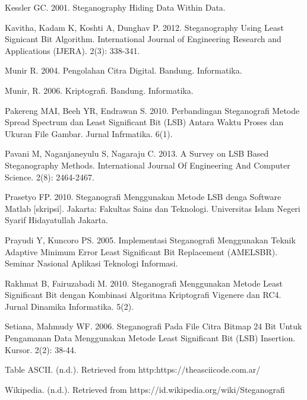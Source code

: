 \documentclass{jtetiskripsi}
\begin{document}
\begin{thebibliography}{99}
	 Kessler GC. 2001. Steganography Hiding Data Within Data.
	
	 Kavitha, Kadam K, Koshti A, Dunghav P. 2012. Steganography Using Least Signicant Bit Algorithm. International Journal of Engineering Research and Applications (IJERA). 2(3): 338-341.
	
	 Munir R. 2004. Pengolahan Citra Digital. Bandung. Informatika.
	
	 Munir, R. 2006. Kriptografi. Bandung. Informatika.
	
	 Pakereng MAI, Beeh YR, Endrawan S. 2010. Perbandingan Steganografi Metode Spread Spectrum dan Least Significant Bit (LSB) Antara Waktu Proses dan Ukuran File Gambar. Jurnal Infrmatika. 6(1).
	
	 Pavani M, Naganjaneyulu S, Nagaraju C. 2013. A Survey on LSB Based Steganography Methods. International Journal Of Engineering And Computer Science. 2(8): 2464-2467.
	
	 Prasetyo FP. 2010. Steganografi Menggunakan Metode LSB denga Software Matlab [skripsi]. Jakarta: Fakultas Sains dan Teknologi. Universitas Islam Negeri Syarif Hidayatullah Jakarta.
	
	 Prayudi Y, Kuncoro PS. 2005. Implementasi Steganografi Menggunakan Teknik Adaptive Minimum Error Least Significant Bit Replacement (AMELSBR). Seminar Nasional Aplikasi Teknologi Informasi.
	
	 Rakhmat B, Fairuzabadi M. 2010. Steganografi Menggunakan Metode Least Significant Bit dengan Kombinasi Algoritma Kriptografi Vigenere dan RC4. Jurnal Dinamika Informatika. 5(2).
	
	 Setiana, Mahmudy WF. 2006. Steganografi Pada File Citra Bitmap 24 Bit Untuk Pengamanan Data Menggunakan Metode Least Significant Bit (LSB) Insertion. Kursor. 2(2): 38-44.
	
	 Table ASCII. (n.d.). Retrieved from http:https://theasciicode.com.ar/
	
	 Wikipedia. (n.d.). Retrieved from https://id.wikipedia.org/wiki/Steganografi
		
		
	
\end{thebibliography}



%
\end{document}

